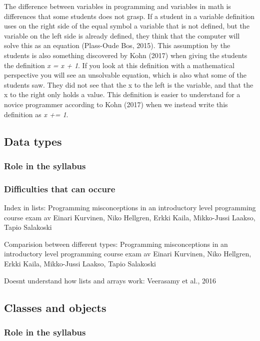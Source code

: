 \documentclass[twocolumn]{article}
\begin{document}
The difference between variables in programming and variables in math is differences that some students does not grasp. If a student in a variable definition uses on the right side of the equal symbol a variable that is not defined, but the variable on the left side is already defined, they think that the computer will solve this as an equation (Plass-Oude Bos, 2015). This assumption by the students is also something discovered by Kohn (2017) when giving the students the definition \emph{x = x + 1}. If you look at this definition with a mathematical perspective you will see an unsolvable equation, which is also what some of the students saw. They did not see that the x to the left is the variable, and that the x to the right only holds a value. This definition is  easier to understand for a novice programmer according to Kohn (2017) when we instead write this definition as \emph{x += 1}. 


\subsection{Data types}

\subsubsection{Role in the syllabus}

\subsubsection{Difficulties that can occure}

Index in lists: Programming misconceptions in an introductory level programming course exam av Einari Kurvinen, Niko Hellgren, Erkki Kaila, Mikko-Jussi Laakso, Tapio Salakoski

Comparision between different types: Programming misconceptions in an introductory level programming course exam av Einari Kurvinen, Niko Hellgren, Erkki Kaila, Mikko-Jussi Laakso, Tapio Salakoski

Doesnt understand how lists and arrays work: Veerasamy et al., 2016

\subsection{Classes and objects}

\subsubsection{Role in the syllabus}
\end{document}
